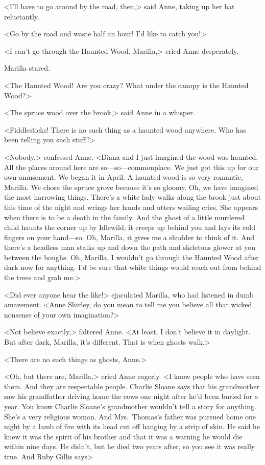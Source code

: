 <I'll have to go around by the road, then,> said Anne, taking up her hat reluctantly.

<Go by the road and waste half an hour! I'd like to catch you!>

<I can't go through the Haunted Wood, Marilla,> cried Anne desperately.

Marilla stared.

<The Haunted Wood! Are you crazy? What under the canopy is the Haunted Wood?>

<The spruce wood over the brook,> said Anne in a whisper.

<Fiddlesticks! There is no such thing as a haunted wood anywhere. Who has been telling you such stuff?>

<Nobody,> confessed Anne. <Diana and I just imagined the wood was haunted. All the places around here are so—so—commonplace. We just got this up for our own amusement. We began it in April. A haunted wood is so very romantic, Marilla. We chose the spruce grove because it's so gloomy. Oh, we have imagined the most harrowing things. There's a white lady walks along the brook just about this time of the night and wrings her hands and utters wailing cries. She appears when there is to be a death in the family. And the ghost of a little murdered child haunts the corner up by Idlewild; it creeps up behind you and lays its cold fingers on your hand—so. Oh, Marilla, it gives me a shudder to think of it. And there's a headless man stalks up and down the path and skeletons glower at you between the boughs. Oh, Marilla, I wouldn't go through the Haunted Wood after dark now for anything. I'd be sure that white things would reach out from behind the trees and grab me.>

<Did ever anyone hear the like!> ejaculated Marilla, who had listened in dumb amazement. <Anne Shirley, do you mean to tell me you believe all that wicked nonsense of your own imagination?>

<Not believe exactly,> faltered Anne. <At least, I don't believe it in daylight. But after dark, Marilla, it's different. That is when ghosts walk.>

<There are no such things as ghosts, Anne.>

<Oh, but there are, Marilla,> cried Anne eagerly. <I know people who have seen them. And they are respectable people. Charlie Sloane says that his grandmother saw his grandfather driving home the cows one night after he'd been buried for a year. You know Charlie Sloane's grandmother wouldn't tell a story for anything. She's a very religious woman. And Mrs.~Thomas's father was pursued home one night by a lamb of fire with its head cut off hanging by a strip of skin. He said he knew it was the spirit of his brother and that it was a warning he would die within nine days. He didn't, but he died two years after, so you see it was really true. And Ruby Gillis says\longdash>

